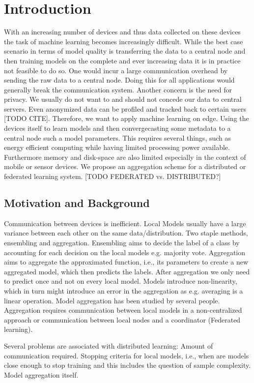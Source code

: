 \chapter{Introduction}
With an increasing number of devices and thus data collected on these devices the task of machine learning becomes increasingly difficult.
While the best case scenario in terms of model quality is transferring the data to a central node and then training models on the complete and ever increasing data it is in practice not feasible to do so.
One would incur a large communication overhead by sending the raw data to a central node. 
Doing this for all applications would generally break the communication system. 
Another concern is the need for privacy. We usually do not want to and should not concede our data to central servers.
Even anonymized data can be profiled and tracked back to certain users [TODO CITE].
Therefore, we want to apply machine learning on edge.
Using the devices itself to learn models and then convergecasting some metadata to a central node such a model parameters.
This requires several things, such as energy efficient computing while having limited processing power available.
Furthermore memory and disk-space are also limited especially in the context of mobile or sensor devices.
We propose an aggregation scheme for a distributed or federated learning system. [TODO FEDERATED vs. DISTRIBUTED?]

\section{Motivation and Background}
Communication between devices is inefficient.
Local Models usually have a large variance between each other on the same data/distribution.
Two staple methods, ensembling and aggregation.
Ensembling aims to decide the label of a class by accounting for each decision on the local models e.g. majority vote.
Aggregation aims to aggregate the approximated function, i.e., its parameters to create a new aggregated model, which then predicts the labels.
After aggregation we only need to predict once and not on every local model.
Models introduce non-linearity, which in turn might introduce an error in the aggregation as e.g. averaging is a linear operation.
Model aggregation has been studied by several people.
Aggregation requires communication between local models in a non-centralized approach or communication between local nodes and a coordinator (Federated learning).

Several problems are associated with distributed learning:
Amount of communication required.
Stopping criteria for local models, i.e., when are models close enough to stop training and this includes the question of sample complexity.
Model aggregation itself.

